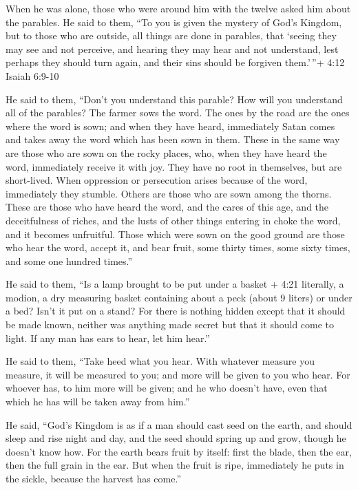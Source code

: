  When he was alone, those who were around him with the
twelve asked him about the parables.  He said to them, ``To
you is given the mystery of God's Kingdom, but to those who are outside,
all things are done in parables,  that `seeing they may see
and not perceive, and hearing they may hear and not understand, lest
perhaps they should turn again, and their sins should be forgiven
them.'\,''+ 4:12 Isaiah 6:9-10

 He said to them, ``Don't you understand this parable? How
will you understand all of the parables?  The farmer sows
the word.  The ones by the road are the ones where the word
is sown; and when they have heard, immediately Satan comes and takes
away the word which has been sown in them.  These in the
same way are those who are sown on the rocky places, who, when they have
heard the word, immediately receive it with joy.  They have
no root in themselves, but are short-lived. When oppression or
persecution arises because of the word, immediately they stumble.
 Others are those who are sown among the thorns. These are
those who have heard the word,  and the cares of this age,
and the deceitfulness of riches, and the lusts of other things entering
in choke the word, and it becomes unfruitful.  Those which
were sown on the good ground are those who hear the word, accept it, and
bear fruit, some thirty times, some sixty times, and some one hundred
times.''

 He said to them, ``Is a lamp brought to be put under a
basket + 4:21 literally, a modion, a dry measuring basket containing
about a peck (about 9 liters) or under a bed? Isn't it put on a stand?
 For there is nothing hidden except that it should be made
known, neither was anything made secret but that it should come to
light.  If any man has ears to hear, let him hear.''

 He said to them, ``Take heed what you hear. With whatever
measure you measure, it will be measured to you; and more will be given
to you who hear.  For whoever has, to him more will be
given; and he who doesn't have, even that which he has will be taken
away from him.''

 He said, ``God's Kingdom is as if a man should cast seed
on the earth,  and should sleep and rise night and day, and
the seed should spring up and grow, though he doesn't know how.
 For the earth bears fruit by itself: first the blade, then
the ear, then the full grain in the ear.  But when the
fruit is ripe, immediately he puts in the sickle, because the harvest
has come.''

